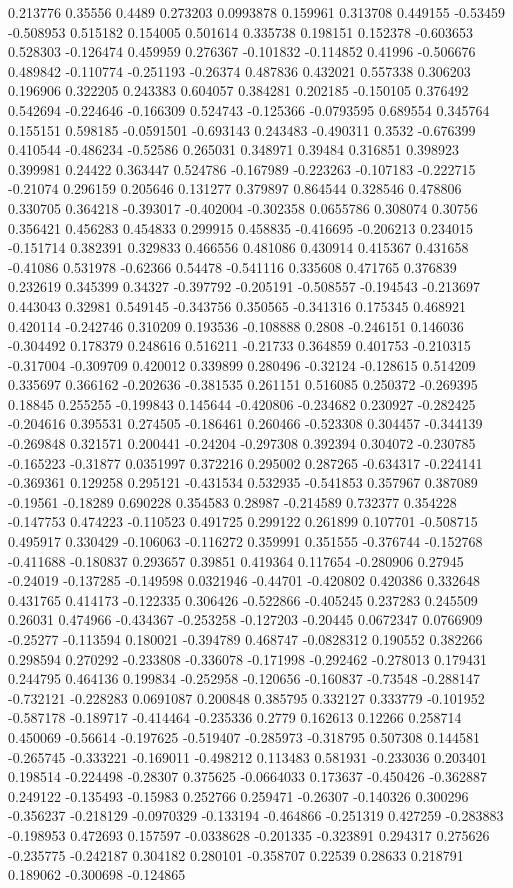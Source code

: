 0.213776 0.35556 0.4489 0.273203 0.0993878 0.159961 0.313708 0.449155 -0.53459 -0.508953 0.515182 0.154005 0.501614 0.335738 0.198151 0.152378 -0.603653 0.528303 -0.126474 0.459959 0.276367 -0.101832 -0.114852 0.41996 -0.506676 0.489842 -0.110774 -0.251193 -0.26374 0.487836 0.432021 0.557338 0.306203 0.196906 0.322205 0.243383 0.604057 0.384281 0.202185 -0.150105 0.376492 0.542694 -0.224646 -0.166309 0.524743 -0.125366 -0.0793595 0.689554 0.345764 0.155151 0.598185 -0.0591501 -0.693143 0.243483 -0.490311 0.3532 -0.676399 0.410544 -0.486234 -0.52586 0.265031 0.348971 0.39484 0.316851 0.398923 0.399981 0.24422 0.363447 0.524786 -0.167989 -0.223263 -0.107183 -0.222715 -0.21074 0.296159 0.205646 0.131277 0.379897 0.864544 0.328546 0.478806 0.330705 0.364218 -0.393017 -0.402004 -0.302358 0.0655786 0.308074 0.30756 0.356421 0.456283 0.454833 0.299915 0.458835 -0.416695 -0.206213 0.234015 -0.151714 0.382391 0.329833 0.466556 0.481086 0.430914 0.415367 0.431658 -0.41086 0.531978 -0.62366 0.54478 -0.541116 0.335608 0.471765 0.376839 0.232619 0.345399 0.34327 -0.397792 -0.205191 -0.508557 -0.194543 -0.213697 0.443043 0.32981 0.549145 -0.343756 0.350565 -0.341316 0.175345 0.468921 0.420114 -0.242746 0.310209 0.193536 -0.108888 0.2808 -0.246151 0.146036 -0.304492 0.178379 0.248616 0.516211 -0.21733 0.364859 0.401753 -0.210315 -0.317004 -0.309709 0.420012 0.339899 0.280496 -0.32124 -0.128615 0.514209 0.335697 0.366162 -0.202636 -0.381535 0.261151 0.516085 0.250372 -0.269395 0.18845 0.255255 -0.199843 0.145644 -0.420806 -0.234682 0.230927 -0.282425 -0.204616 0.395531 0.274505 -0.186461 0.260466 -0.523308 0.304457 -0.344139 -0.269848 0.321571 0.200441 -0.24204 -0.297308 0.392394 0.304072 -0.230785 -0.165223 -0.31877 0.0351997 0.372216 0.295002 0.287265 -0.634317 -0.224141 -0.369361 0.129258 0.295121 -0.431534 0.532935 -0.541853 0.357967 0.387089 -0.19561 -0.18289 0.690228 0.354583 0.28987 -0.214589 0.732377 0.354228 -0.147753 0.474223 -0.110523 0.491725 0.299122 0.261899 0.107701 -0.508715 0.495917 0.330429 -0.106063 -0.116272 0.359991 0.351555 -0.376744 -0.152768 -0.411688 -0.180837 0.293657 0.39851 0.419364 0.117654 -0.280906 0.27945 -0.24019 -0.137285 -0.149598 0.0321946 -0.44701 -0.420802 0.420386 0.332648 0.431765 0.414173 -0.122335 0.306426 -0.522866 -0.405245 0.237283 0.245509 0.26031 0.474966 -0.434367 -0.253258 -0.127203 -0.20445 0.0672347 0.0766909 -0.25277 -0.113594 0.180021 -0.394789 0.468747 -0.0828312 0.190552 0.382266 0.298594 0.270292 -0.233808 -0.336078 -0.171998 -0.292462 -0.278013 0.179431 0.244795 0.464136 0.199834 -0.252958 -0.120656 -0.160837 -0.73548 -0.288147 -0.732121 -0.228283 0.0691087 0.200848 0.385795 0.332127 0.333779 -0.101952 -0.587178 -0.189717 -0.414464 -0.235336 0.2779 0.162613 0.12266 0.258714 0.450069 -0.56614 -0.197625 -0.519407 -0.285973 -0.318795 0.507308 0.144581 -0.265745 -0.333221 -0.169011 -0.498212 0.113483 0.581931 -0.233036 0.203401 0.198514 -0.224498 -0.28307 0.375625 -0.0664033 0.173637 -0.450426 -0.362887 0.249122 -0.135493 -0.15983 0.252766 0.259471 -0.26307 -0.140326 0.300296 -0.356237 -0.218129 -0.0970329 -0.133194 -0.464866 -0.251319 0.427259 -0.283883 -0.198953 0.472693 0.157597 -0.0338628 -0.201335 -0.323891 0.294317 0.275626 -0.235775 -0.242187 0.304182 0.280101 -0.358707 0.22539 0.28633 0.218791 0.189062 -0.300698 -0.124865 